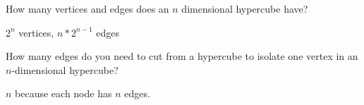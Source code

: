 \question How many vertices and edges does an $n$ dimensional hypercube have?
\begin{solution}[0.6in] $2^n$ vertices, $n * 2^{n-1}$ edges
\end{solution}

\question How many edges do you need to cut from a hypercube 
to isolate one vertex in an $n$-dimensional hypercube? 
\begin{solution}[0.6in] $n$ because each node has $n$ edges.
\end{solution}